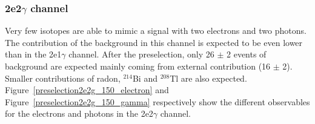 \documentclass[main.tex]{subfiles}
\begin{document}
\FloatBarrier


\subsubsection{2e2$\gamma$ channel}


\NI Very few isotopes are able to mimic a signal with two electrons and two photons. The contribution of the background in this channel is expected to be even lower than in the 2e1$\gamma$ channel. After the preselection, only 26 $\pm$ 2 events of background are expected mainly coming from external contribution (16 $\pm$ 2). Smaller contributions of radon, $^{\text{214}}$Bi and $^{\text{208}}$Tl are also expected. Figure~\ref{preselection2e2g_150_electron} and Figure~\ref{preselection2e2g_150_gamma} respectively show the different observables for the electrons and photons in the 2e2$\gamma$ channel.
\end{document}
